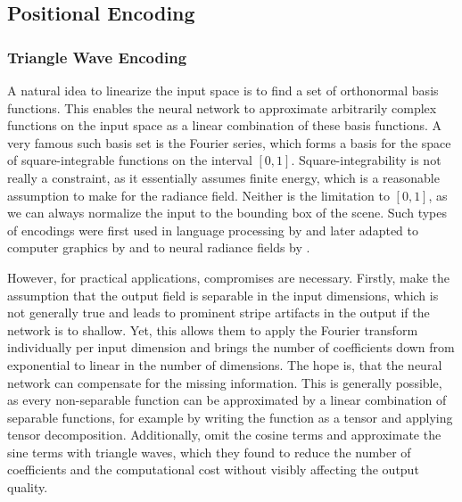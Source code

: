 \subsection{Positional Encoding}

\subsubsection{Triangle Wave Encoding}
A natural idea to linearize the input space is to find a set of orthonormal basis functions.
This enables the neural network to approximate arbitrarily complex functions on the input space as a linear combination of these basis functions.
A very famous such basis set is the Fourier series, which forms a basis for the space of square-integrable functions on the interval $[0, 1]$.
Square-integrability is not really a constraint, as it essentially assumes finite energy, which is a reasonable assumption to make for the radiance field.
Neither is the limitation to $[0, 1]$, as we can always normalize the input to the bounding box of the scene.
Such types of encodings were first used in language processing by \textcite{vaswani2017} and later adapted to computer graphics by \textcite{tancik2020} and to neural radiance fields by \textcite{mildenhall2022}.

However, for practical applications, compromises are necessary.
Firstly, \textcite{tancik2020} make the assumption that the output field is separable in the input dimensions, which is not generally true and leads to prominent stripe artifacts in the output if the network is to shallow.
Yet, this allows them to apply the Fourier transform individually per input dimension and brings the number of coefficients down from exponential to linear in the number of dimensions.
The hope is, that the neural network can compensate for the missing information.
This is generally possible, as every non-separable function can be approximated by a linear combination of separable functions, for example by writing the function as a tensor and applying tensor decomposition.
Additionally, \textcite{muller2021} omit the cosine terms and approximate the sine terms with triangle waves, which they found to reduce the number of coefficients and the computational cost without visibly affecting the output quality.

